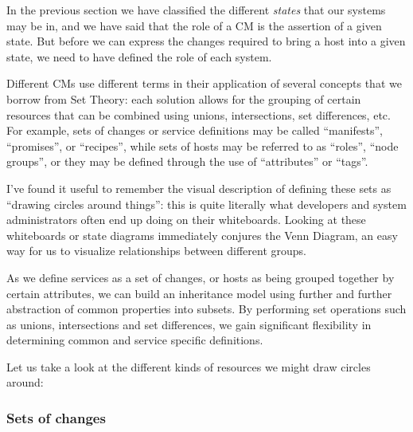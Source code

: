 In the previous section we have classified the
different {\em states} that our systems may be in, and
we have said that the role of a CM is the assertion of
a given state. But before we can express the changes
required to bring a host into a given state, we need
to have defined the role of each system.


Different CMs use different terms in their application
of several concepts that we borrow from Set Theory:
each solution allows for the grouping of certain
resources that can be combined using unions,
intersections, set differences, etc.  For example, sets of
changes or service definitions may be called
``manifests'', ``promises'', or ``recipes'', while
sets of hosts may be referred to as ``roles'', ``node
groups'', or they may be defined through the use of
``attributes'' or ``tags''.

I've found it useful to remember the visual
description of defining these sets as ``drawing
circles around things'': this is quite literally what
developers and system administrators often end up
doing on their whiteboards.  Looking at these
whiteboards or state diagrams immediately conjures the
Venn Diagram, an easy way for us to visualize
relationships between different groups.

As we define services as a set of changes, or hosts as
being grouped together by certain attributes, we can
build an inheritance model using further and further
abstraction of common properties into subsets.  By
performing set operations such as unions,
intersections and set differences, we gain significant
flexibility in determining common and service specific
definitions.

Let us take a look at the different kinds of resources we might draw
circles around:

\subsubsection*{Sets of changes}

